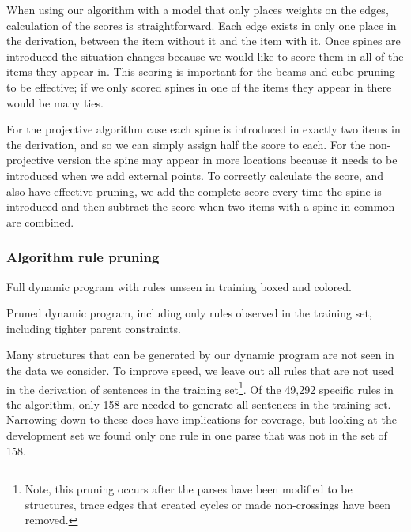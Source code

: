When using our algorithm with a model that only places weights on the edges, calculation of the scores is straightforward.
Each edge exists in only one place in the derivation, between the item without it and the item with it.
Once spines are introduced the situation changes because we would like to score them in all of the items they appear in.
This scoring is important for the beams and cube pruning to be effective; if we only scored spines in one of the items they appear in there would be many ties.

For the projective algorithm case each spine is introduced in exactly two items in the derivation, and so we can simply assign half the score to each.
For the non-projective version the spine may appear in more locations because it needs to be introduced when we add external points.
To correctly calculate the score, and also have effective pruning, we add the complete score every time the spine is introduced and then subtract the score when two items with a spine in common are combined.

\subsubsection{Algorithm rule pruning}

\begin{algorithm}
\vspace{-2mm}

\vspace{-10mm}
\caption{\label{fig:rules-to-prune}
Full dynamic program with rules unseen in training boxed and colored.
}
\end{algorithm}

\begin{algorithm}
\vspace{-2mm}

\vspace{-8mm}
\caption{\label{fig:rules-pruned}
Pruned dynamic program, including only rules observed in the training set, including tighter parent constraints.
}
\end{algorithm}

Many structures that can be generated by our dynamic program are not seen in the data we consider.
To improve speed, we leave out all rules that are not used in the derivation of sentences in the training set\footnote{
Note, this pruning occurs after the parses have been modified to be \oneEC structures, \myie trace edges that created cycles or made non-\oneEC crossings have been removed.
}.
Of the 49,292 specific rules in the algorithm, only 158 are needed to generate all sentences in the training set.
Narrowing down to these does have implications for coverage, but looking at the development set we found only one rule in one parse that was not in the set of 158.

